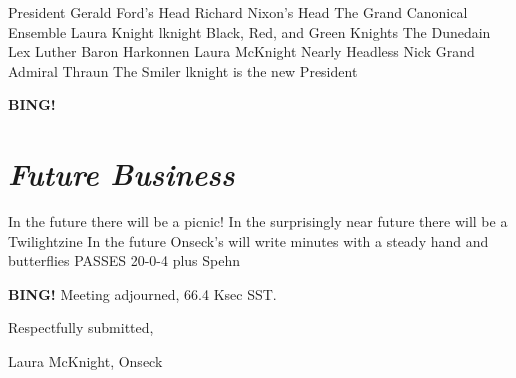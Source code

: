 \documentclass[10pt]{article}
\newcommand{\bing}{{\bf BING!} }
\newcommand{\goto}[1]{\bing \vskip 12pt \section*{{\em{#1}}}}
\newcommand{\ps}{ plus Spehn\xspace}
\newcommand{\onseck}{Laura McKnight, Onseck}
\begin{document}
President
Gerald Ford's Head
Richard Nixon's Head
The Grand Canonical Ensemble
Laura Knight
lknight
Black, Red, and Green Knights
The Dunedain
Lex Luther
Baron Harkonnen
Laura McKnight
Nearly Headless Nick
Grand Admiral Thraun
The Smiler
lknight is the new President


\goto{Future Business}

In the future there will be a picnic!
In the surprisingly near future there will be a Twilightzine
In the future Onseck's will write minutes with a steady hand and butterflies PASSES 20-0-4\ps


\bing
\noindent
Meeting adjourned, 66.4 Ksec SST.

\vspace{18pt}

\centerline{Respectfully submitted,}
\centerline{\onseck}
\end{document}
